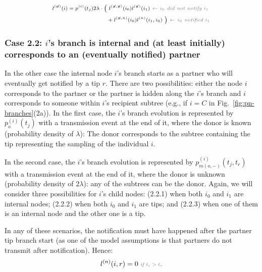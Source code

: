 \documentclass[a4paper,10pt]{article}
\begin{document}
\begin{equation}
\scriptsize
\begin{split}
l^{(\not{n})}(i) = p^{(i)}(t_j) 2\lambda \cdot 
\Big(&~l^{(\not{n},\not{n})}(i_0)l^{(\not{n})}(i_1) \textit{\color{gray}~$\leftarrow$ $i_0$ did not notify $i_1$ } \\
&+ l^{(\not{n},n)}(i_0)l^{(n)}(i_1,i_0)~\Big) \textit{\color{gray}~$\leftarrow$ $i_0$ notified $i_1$} \\
\end{split}\label{eq:lu-int-tip}
\end{equation}

\subsubsection*{Case 2.2: $i$'s branch is internal and (at least initially) corresponds to an (eventually notified) partner} 

In the other case the internal node $i$'s branch starts as a partner who will eventually get notified by a tip $r$.
There are two possibilities: either the node $i$ corresponds to the partner or the partner is hidden along the $i$'s branch and $i$ corresponds to someone within $i$'s recipient subtree (e.g., if $i=C$ in Fig.~\ref{fig:pn-branches}(2a)). In the first case, the $i$'s branch evolution is represented by $p_o^{(i)}(t_j)$ with a transmission event at the end of it, where the donor is known (probability density of $\lambda$): The donor corresponds to the subtree containing the tip representing the sampling of the individual $i$.

In the second case, the $i$'s branch evolution is represented by $p_{m(o,-)}^{(i)}(t_j,t_r)$ with a transmission event at the end of it, where the donor is unknown (probability density of $2\lambda$): any of the subtrees can be the donor.
Again, we will consider three possibilities for $i$'s child nodes: (2.2.1) when both $i_0$ and $i_1$ are internal nodes; (2.2.2) when both $i_0$ and $i_1$ are tips; and (2.2.3) when one of them is an internal node and the other one is a tip.

In any of these scenarios, the notification must have happened after the partner tip branch start (as one of the model assumptions is that partners do not transmit after notification). Hence:
\begin{equation}
\scriptsize
l^{(n)}(i, r) = 0 \textit{\color{gray}~if $t_i > t_r$} \\
\label{eq:lp-zero}
\end{equation}
\end{document}
